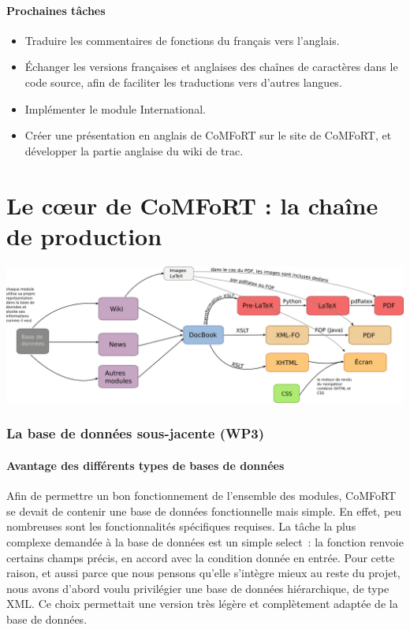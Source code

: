 \documentclass[final,11pt,a4paper,twoside,titlepage]{article}
\newcommand{\p}{\vspace{0.3em}}
\begin{document}
{    \subsection{Prochaines tâches}

    \begin{itemize}
     \item Traduire les commentaires de fonctions du français vers
	   l'anglais.
     \item Échanger les versions françaises et anglaises des chaînes de
	   caractères dans le code source, afin de faciliter les
	   traductions vers d'autres langues.
     \item Implémenter le module International.
     \item Créer une présentation en anglais de CoMFoRT sur le site de
	   CoMFoRT, et développer la partie anglaise du wiki de trac.
    \end{itemize}

\part{Le c\oe ur de CoMFoRT : la chaîne de production}

  \vspace{1em}
  \begin{center}
  \includegraphics[width=18cm]{drawing.png}
  \end{center}
  \vspace{1em}
  
  \section{La base de données sous-jacente (WP3)}
    \subsection{Avantage des différents types de bases de données}  
  Afin de permettre un bon fonctionnement de l'ensemble des modules, CoMFoRT se devait de 
  contenir une base de données fonctionnelle mais simple. En effet, peu
  nombreuses sont les fonctionnalités spécifiques requises. La tâche la plus complexe 
  demandée à la base de données est un simple select~: la fonction renvoie certains champs 
  précis, en accord avec la condition donnée en entrée. Pour cette raison, et aussi parce 
  que nous pensons qu'elle s'intègre mieux au reste du projet, nous
  avons d'abord voulu privilégier
  une base de données hiérarchique, de type XML. Ce choix permettait une version très légère et
  complètement adaptée de la base de données. \p

}
\end{document}
